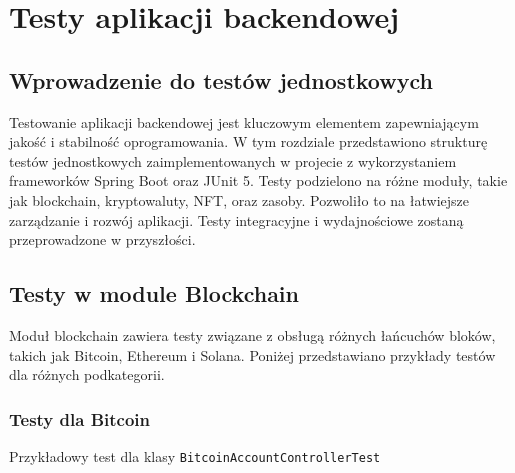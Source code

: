 \chapter{Testy aplikacji backendowej}

\section{Wprowadzenie do testów jednostkowych}

Testowanie aplikacji backendowej jest kluczowym elementem zapewniającym jakość i stabilność oprogramowania. W tym rozdziale przedstawiono strukturę testów jednostkowych zaimplementowanych w projecie z wykorzystaniem frameworków Spring Boot oraz JUnit 5. Testy podzielono na różne moduły, takie jak blockchain, kryptowaluty, NFT, oraz zasoby. Pozwoliło to na łatwiejsze zarządzanie i rozwój aplikacji. Testy integracyjne i wydajnościowe zostaną przeprowadzone w przyszłości.

\section{Testy w module Blockchain}

Moduł blockchain zawiera testy związane z obsługą różnych łańcuchów bloków, takich jak Bitcoin, Ethereum i Solana. Poniżej przedstawiano przykłady testów dla różnych podkategorii.

\subsection{Testy dla Bitcoin}

Przykładowy test dla klasy \texttt{BitcoinAccountControllerTest}

